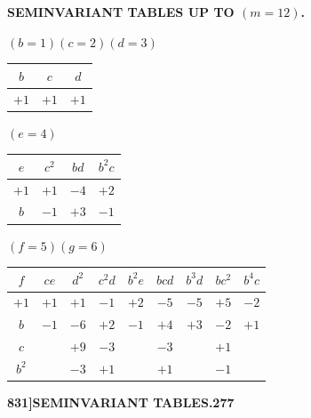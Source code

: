 \documentclass[12pt,a4paper]{article}
\theoremstyle{definition}
\begin{document}
\begin{center}
\textbf{SEMINVARIANT TABLES UP TO $(m = 12)$.}
\end{center}

\medskip

\noindent $(b = 1)$\hfill$(c = 2)$\hfill$(d = 3)$

\begin{center}
\begin{tabular}{|c|c|c|}
\hline
$b$ & $c$ & $d$ \\
\hline
$+1$ & $+1$ & $+1$ \\
\hline
\end{tabular}
\end{center}

\medskip

\noindent $(e = 4)$
\begin{center}
\begin{tabular}{|c|c|c|c|}
\hline
$e$ & $c^2$ & $bd$ & $b^2c$ \\
\hline
$+1$ & $+1$ & $-4$ & $+2$ \\
$b$ & $-1$ & $+3$ & $-1$ \\
\hline
\end{tabular}
\end{center}

\medskip

\noindent $(f = 5)$\hfill$(g = 6)$
\begin{center}
\begin{tabular}{|c|c|c|c|c|c|c|c|c|}
\hline
$f$ & $ce$ & $d^2$ & $c^2d$ & $b^2e$ & $bcd$ & $b^3d$ & $bc^2$ & $b^4c$ \\
\hline
$+1$ & $+1$ & $+1$ & $-1$ & $+2$ & $-5$ & $-5$ & $+5$ & $-2$ \\
$b$ & $-1$ & $-6$ & $+2$ & $-1$ & $+4$ & $+3$ & $-2$ & $+1$ \\
$c$ & & $+9$ & $-3$ & & $-3$ & & $+1$ & \\
$b^2$ & & $-3$ & $+1$ & & $+1$ & & $-1$ & \\
\hline
\end{tabular}
\end{center}

\newpage
\setcounter{page}{277}

\noindent\textbf{831]}\hfill\textbf{SEMINVARIANT TABLES.}\hfill\textbf{277}

\bigskip
\end{document}

